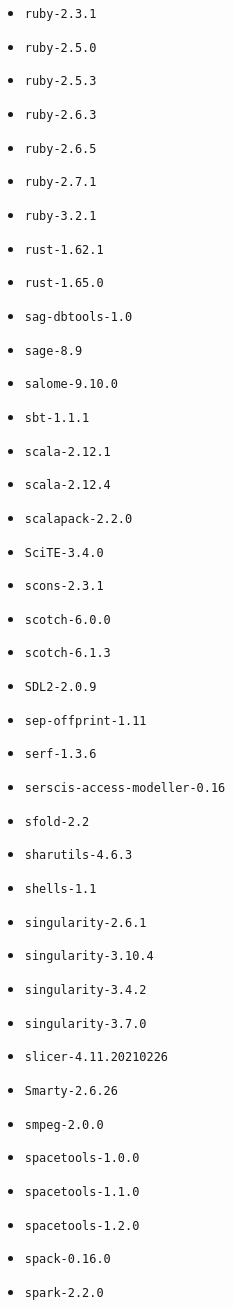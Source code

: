 \begin{itemize}
\item \verb|ruby-2.3.1|
\item \verb|ruby-2.5.0|
\item \verb|ruby-2.5.3|
\item \verb|ruby-2.6.3|
\item \verb|ruby-2.6.5|
\item \verb|ruby-2.7.1|
\item \verb|ruby-3.2.1|
\item \verb|rust-1.62.1|
\item \verb|rust-1.65.0|
\item \verb|sag-dbtools-1.0|
\item \verb|sage-8.9|
\item \verb|salome-9.10.0|
\item \verb|sbt-1.1.1|
\item \verb|scala-2.12.1|
\item \verb|scala-2.12.4|
\item \verb|scalapack-2.2.0|
\item \verb|SciTE-3.4.0|
\item \verb|scons-2.3.1|
\item \verb|scotch-6.0.0|
\item \verb|scotch-6.1.3|
\item \verb|SDL2-2.0.9|
\item \verb|sep-offprint-1.11|
\item \verb|serf-1.3.6|
\item \verb|serscis-access-modeller-0.16|
\item \verb|sfold-2.2|
\item \verb|sharutils-4.6.3|
\item \verb|shells-1.1|
\item \verb|singularity-2.6.1|
\item \verb|singularity-3.10.4|
\item \verb|singularity-3.4.2|
\item \verb|singularity-3.7.0|
\item \verb|slicer-4.11.20210226|
\item \verb|Smarty-2.6.26|
\item \verb|smpeg-2.0.0|
\item \verb|spacetools-1.0.0|
\item \verb|spacetools-1.1.0|
\item \verb|spacetools-1.2.0|
\item \verb|spack-0.16.0|
\item \verb|spark-2.2.0|

\end{itemize}
